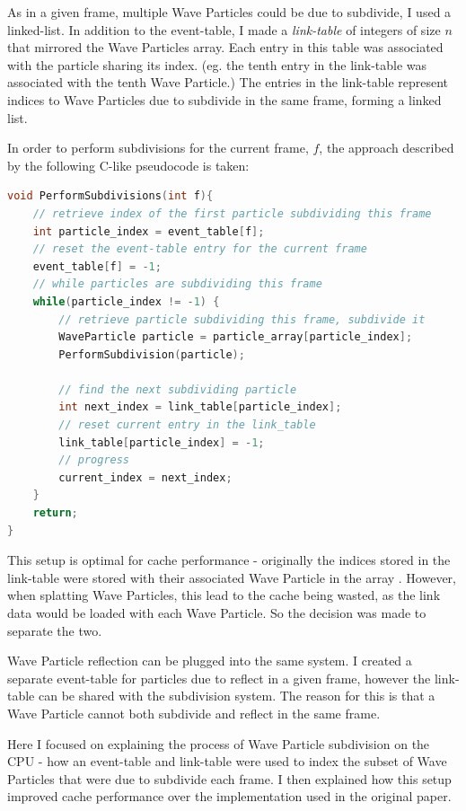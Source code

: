 \documentclass[12pt,a4paper,twoside]{report}
\begin{document}
As in a given frame, multiple Wave Particles could be due to subdivide, I used
a linked-list. In addition to the event-table, I made a \textit{link-table} of
integers of size $n$ that mirrored the Wave Particles array. Each entry in this
table was associated with the particle sharing its index. (eg. the tenth entry
in the link-table was associated with the tenth Wave Particle.) The entries in
the link-table represent indices to Wave Particles due to subdivide in the same
frame, forming a linked list.

In order to perform subdivisions for the current frame, $f$, the approach
described by the following C-like pseudocode is taken:

\begin{lstlisting}[language={C}]
void PerformSubdivisions(int f){
    // retrieve index of the first particle subdividing this frame
    int particle_index = event_table[f];
    // reset the event-table entry for the current frame
    event_table[f] = -1;
    // while particles are subdividing this frame
    while(particle_index != -1) {
        // retrieve particle subdividing this frame, subdivide it
        WaveParticle particle = particle_array[particle_index];
        PerformSubdivision(particle);

        // find the next subdividing particle
        int next_index = link_table[particle_index];
        // reset current entry in the link_table
        link_table[particle_index] = -1;
        // progress
        current_index = next_index;
    }
    return;
}
\end{lstlisting}

This setup is optimal for cache performance - originally the indices stored in
the link-table were stored with their associated Wave Particle in the array
\cite{Yuksel2007}. However, when splatting Wave Particles, this lead to the
cache being wasted, as the link data would be loaded with each Wave Particle.
So the decision was made to separate the two.

Wave Particle reflection can be plugged into the same system. I created a
separate event-table for particles due to reflect in a given frame, however the
link-table can be shared with the subdivision system. The reason for this is
that a Wave Particle cannot both subdivide and reflect in the same frame.

Here I focused on explaining the process of Wave Particle
subdivision on the CPU - how an event-table and link-table were used to index
the subset of Wave Particles that were due to subdivide each frame. I then
explained how this setup improved cache performance over the implementation
used in the original paper.
\end{document}
